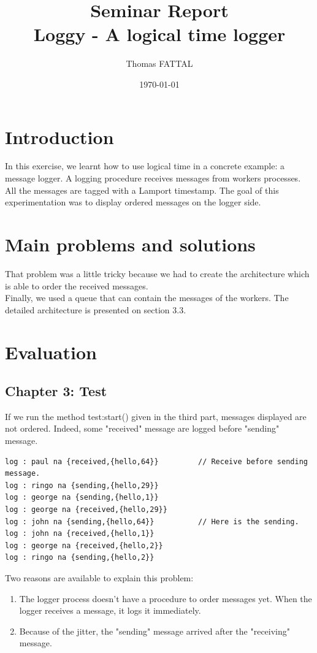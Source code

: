 \documentclass[a4paper, 11pt]{article}
\title{Seminar Report\\Loggy - A logical time logger}
\author{Thomas FATTAL}
\date{\today{}}
\begin{document}
\maketitle

\section{Introduction}

In this exercise, we learnt how to use logical time in a concrete example: a message logger. A logging procedure receives messages from workers processes. All the messages are tagged with a Lamport timestamp. The goal of this experimentation was to display ordered messages on the logger side.


\section{Main problems and solutions}

That problem was a little tricky because we had to create the architecture which is able to order the received messages.\\
Finally, we used a queue that can contain the messages of the workers. The detailed architecture is presented on section 3.3.



\section{Evaluation}
\subsection{Chapter 3: Test}
If we run the method test:start() given in the third part, messages displayed are not ordered. Indeed, some "received" message are logged before "sending" message.

\begin{verbatim}
log : paul na {received,{hello,64}}			// Receive before sending message.
log : ringo na {sending,{hello,29}}
log : george na {sending,{hello,1}}
log : george na {received,{hello,29}}
log : john na {sending,{hello,64}}			// Here is the sending.
log : john na {received,{hello,1}}
log : george na {received,{hello,2}}
log : ringo na {sending,{hello,2}}
\end{verbatim}

Two reasons are available to explain this problem:
\begin{enumerate}
\item The logger process doesn't have a procedure to order messages yet. When the logger receives a message, it logs it immediately.
\item Because of the jitter, the "sending" message arrived after the "receiving" message.
\end{enumerate}
\end{document}
